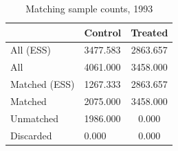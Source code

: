 \begin{table}

\caption{\label{tab:psm}Matching sample counts, 1993}
\centering
\begin{tabular}[t]{llc}
\toprule
  & Control & Treated\\
\midrule
All (ESS) & 3477.583 & 2863.657\\
All & 4061.000 & 3458.000\\
Matched (ESS) & 1267.333 & 2863.657\\
Matched & 2075.000 & 3458.000\\
Unmatched & 1986.000 & 0.000\\
\addlinespace
Discarded & 0.000 & 0.000\\
\bottomrule
\end{tabular}
\end{table}
